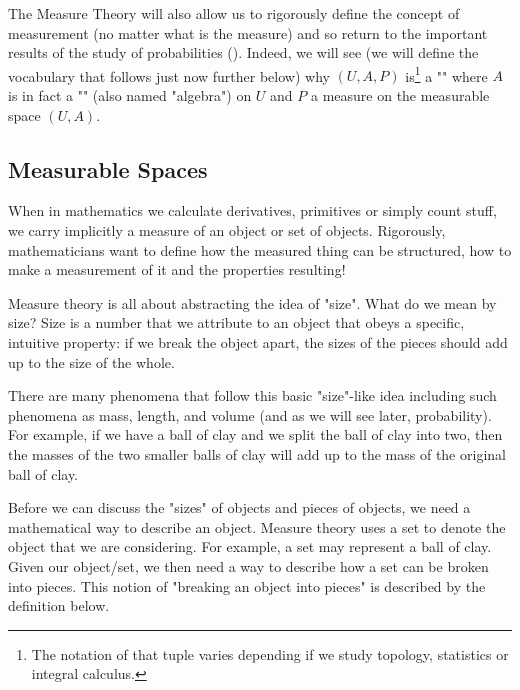 	The Measure Theory will also allow us to rigorously define the concept of measurement (no matter what is the measure) and so return to the important results of the study of probabilities (). Indeed, we will see (we will define the vocabulary that follows just now further below) why $(U, A, P)$ is\footnote{The notation of that tuple varies depending if we study topology, statistics or integral calculus.} a "" where $A$ is in fact a "" (also named "algebra") on $U$ and $P$ a measure on the measurable space $(U, A)$.
	
	\subsection{Measurable Spaces}
	When in mathematics we calculate derivatives, primitives or simply count stuff, we carry implicitly a measure of an object or set of objects. Rigorously, mathematicians want to define how the measured thing can be structured, how to make a measurement of it and the properties resulting!
	
	Measure theory is all about abstracting the idea of "size". What do we mean by size? Size is a number that we attribute to an object that obeys a specific, intuitive property: if we break the object apart, the sizes of the pieces should add up to the size of the whole.
   
	There are many phenomena that follow this basic "size"-like idea including such phenomena as mass, length, and volume (and as we will see later, probability). For example, if we have a ball of clay and we split the ball of clay into two, then the masses of the two smaller balls of clay will add up to the mass of the original ball of clay.

	Before we can discuss the "sizes" of objects and pieces of objects, we need a mathematical way to describe an object. Measure theory uses a set to denote the object that we are considering. For example, a set may represent a ball of clay.
Given our object/set, we then need a way to describe how a set can be broken into pieces. This notion of "breaking an object into pieces" is described by the definition below.
	
